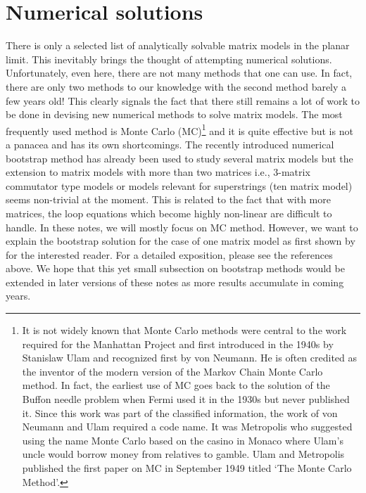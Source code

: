 \documentclass[letter,11pt]{article}
\begin{document}
 
\section{\label{sec:NSOL}Numerical solutions} 
There is only a selected list of analytically solvable matrix models in the planar limit. This inevitably brings 
the thought of attempting numerical solutions. Unfortunately, even here, there are not many methods that one can use. In fact, there are only two methods to our knowledge with the second method barely a few years old! This clearly signals the fact that there still remains a lot of work to be done in devising new numerical 
methods to solve matrix models. The most frequently used method is Monte Carlo (MC)\footnote{
It is not widely known that Monte Carlo methods were central to the work required for the Manhattan Project
and first introduced in the 1940s by Stanislaw Ulam and recognized first by von Neumann. 
He is often credited as the inventor of the modern version of the Markov Chain Monte Carlo 
method. In fact, the earliest use of MC goes back to the solution of the Buffon needle problem when Fermi used it in the 
1930s but never published it. 
Since this work was part of the classified information, the work of von Neumann and Ulam required a code name. It was Metropolis who 
suggested using the name Monte Carlo based on the casino in 
Monaco where Ulam's uncle would borrow money from relatives to gamble. Ulam and Metropolis
published the first paper on MC in September 1949 titled `The Monte Carlo Method'.} 
and it is quite effective but is not a panacea and has its own shortcomings. 
The recently introduced numerical bootstrap method has already been used to study several matrix models \cite{Anderson:2016rcw,Lin:2020mme,Han:2020bkb,Kazakov:2021lel} but the extension to matrix models with more than two matrices i.e., 3-matrix commutator type models or models relevant for superstrings (ten matrix model) seems non-trivial at the moment. This is related to the fact that with more matrices, the loop equations which become highly non-linear are difficult to handle. In these notes, we will mostly focus on MC method. However, we want to explain the bootstrap solution for the case of one matrix model as first shown by \cite{Lin:2020mme} for the interested reader. For a detailed exposition, please see the references above. We hope that this yet small subsection on bootstrap methods would be extended in later versions of these notes as more results accumulate in coming years. 
\end{document}
